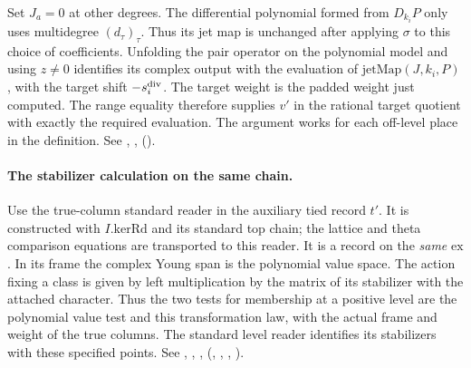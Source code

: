 Set $J_a=0$ at other degrees. The differential polynomial formed
from $D_{k_i}P$ only uses multidegree $(d_\tau)_\tau$. Thus its jet
map is unchanged after applying $\sigma$ to this choice of
coefficients. Unfolding the pair operator on the polynomial model
and using $z\ne0$ identifies its complex output with the evaluation
of $\mathrm{jetMap}(J,k_i,P)$, with the target shift
$-s_i^{\rm div}$. The target weight is the padded weight just
computed. The range equality therefore supplies $v'$ in the
rational target quotient with exactly the required evaluation.
The argument works for each off-level place in the definition.
See , ,
 ().

\paragraph{The stabilizer calculation on the same chain.}
Use the true-column standard reader in the auxiliary tied record
$t'$. It is constructed with $I.\mathrm{kerRd}$ and its standard
top chain; the lattice and theta comparison equations are transported
to this reader. It is a record on the \emph{same} $\mathrm{ex}$.
In its frame the complex Young span is the polynomial value space.
The action fixing a class is given by left multiplication by the
matrix of its stabilizer with the attached character. Thus the two
tests for membership at a positive level are the polynomial value
test and this transformation law, with the actual frame and weight
of the true columns. The standard level reader identifies its
stabilizers with these specified points. See ,
, , 
(,
,
,
).

